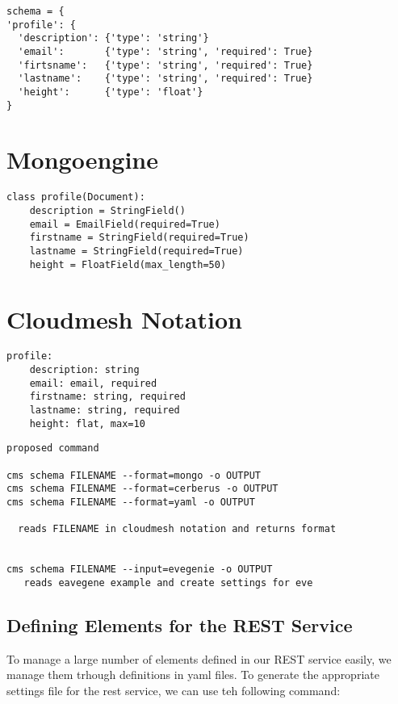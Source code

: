 \documentclass[9pt,twocolumn,twoside]{styles/osajnl}
\begin{document}
\begin{Verbatim}
schema = {
'profile': {
  'description': {'type': 'string'}
  'email':       {'type': 'string', 'required': True}
  'firtsname':   {'type': 'string', 'required': True}
  'lastname':    {'type': 'string', 'required': True}
  'height':      {'type': 'float'}
}
\end{Verbatim}

\section{Mongoengine}

\begin{Verbatim}
class profile(Document):
    description = StringField()
    email = EmailField(required=True)
    firstname = StringField(required=True)
    lastname = StringField(required=True)
    height = FloatField(max_length=50)
\end{Verbatim}

\section{Cloudmesh Notation}

\begin{Verbatim}
profile:
    description: string
    email: email, required
    firstname: string, required
    lastname: string, required
    height: flat, max=10
\end{Verbatim}

\begin{Verbatim}
proposed command

cms schema FILENAME --format=mongo -o OUTPUT
cms schema FILENAME --format=cerberus -o OUTPUT
cms schema FILENAME --format=yaml -o OUTPUT

  reads FILENAME in cloudmesh notation and returns format


cms schema FILENAME --input=evegenie -o OUTPUT
   reads eavegene example and create settings for eve
\end{Verbatim}


\subsection{Defining Elements for the REST Service}

To manage a large number of elements defined in our REST service
easily, we manage them trhough definitions in yaml files. To generate
the appropriate settings file for the rest service, we can use teh
following command:
\end{document}
